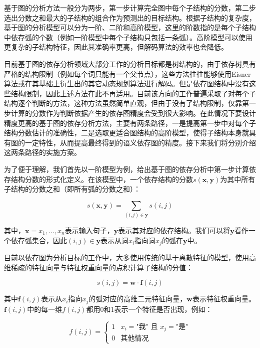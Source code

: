 基于图的分析方法一般分为两步，第一步计算完全图中每个子结构的分数，第二步选出分数之和最大的子结构的组合作为预测出的目标结构。根据子结构的复杂度，基于图的分析模型可以分为一阶、二阶和高阶模型，这里的阶数指的是每个子结构中依存弧的个数（例如一阶模型中每个子结构只包括一条弧）。高阶模型可以使用更复杂的子结构特征，因此其准确率更高，但解码算法的效率也会降低。

目前基于图的依存分析领域大部分工作的分析目标都是树结构的，由于依存树具有严格的结构限制（例如每个词只能有一个父节点），这些方法往往能够使用Eisner算法或在其基础上衍生出的其它动态规划算法进行解码。但是依存图结构中没有这些结构限制，因此上述方法在此不再适用。目前该方向的工作普遍采取了对每个子结构逐个判断的方法，这种方法虽然简单直观，但由于没有了结构限制，仅靠第一步计算的分数作为判断依据产生的依存图精度会受到很大影响。在此情况下要设计精度更高的基于图的依存分析方法，主要有两条路径，一是提高第一步中对每个子结构分数估计的准确性，二是选取更适合图结构的高阶模型，使得子结构本身就具有图的一定特性，从而提高最终得到的语义依存图的精度。接下来我们将分别介绍这两条路径的实施方案。

为了便于理解，我们首先以一阶模型为例，给出基于图的依存分析中第一步计算依存结构分数的形式化定义。在该模型中，一个依存结构的分数$s(\boldsymbol{x},\boldsymbol{y})$为其中所有子结构的分数之和（即所有弧的分数之和）：

\begin{equation}
s(\boldsymbol{x},\boldsymbol{y})=\sum_{(i,j) \in \boldsymbol{y}} s(i,j)
\end{equation}

其中，$\boldsymbol{x}=x_1,\dots,x_n$表示输入句子，$\boldsymbol{y}$表示其对应的依存结构。我们可以将$\boldsymbol{y}$看作一个依存弧集合，因此$(i,j) \in \boldsymbol{y}$表示从词$x_i$指向词$x_j$的弧在$\boldsymbol{y}$中。

目前以依存图为分析目标的工作中，大多使用传统的基于离散特征的模型，使用高维稀疏的特征向量与特征权重向量的点积计算子结构的分值：

\begin{equation}
s(i,j) = \mathbf{w} \cdot \mathbf{f}(i,j)
\end{equation}

其中$\mathbf{f}(i,j)$表示从$x_i$指向$x_j$的弧对应的高维二元特征向量，$\mathbf{w}$表示特征权重向量。$\mathbf{f}(i,j)$中的每一维$f(i,j)$都用0和1表示一个特征是否出现，例如：

\begin{equation}
f(i,j)=
\begin{cases}
1& x_i = \text{"我" 且\ } x_j = \text{"是"} \\
0& \text{其他情况}
\end{cases}
\end{equation}

